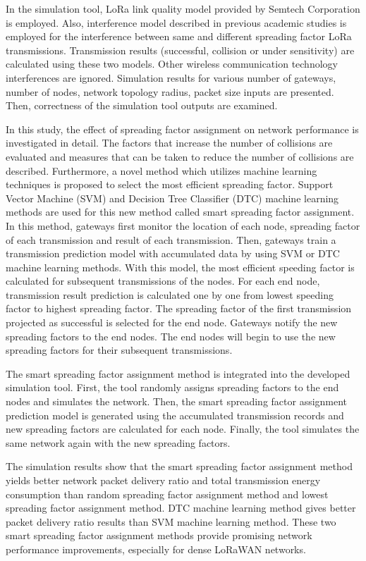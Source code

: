 In the simulation tool, LoRa link quality model provided by Semtech Corporation is employed. Also, interference model described in previous academic studies is employed for the interference between same and different spreading factor LoRa transmissions. Transmission results (successful, collision or under sensitivity) are calculated using these two models. Other wireless communication technology interferences are ignored. Simulation results for various number of gateways, number of nodes, network topology radius, packet size inputs are presented. Then, correctness of the simulation tool outputs are examined.

In this study, the effect of spreading factor assignment on network performance is investigated in detail. The factors that increase the number of collisions are evaluated and measures that can be taken to reduce the number of collisions are described. Furthermore, a novel method which utilizes machine learning techniques is proposed to select the most efficient spreading factor. Support Vector Machine (SVM) and Decision Tree Classifier (DTC) machine learning methods are used for this new method called smart spreading factor assignment. In this method, gateways first monitor the location of each node, spreading factor of each transmission and result of each transmission. Then, gateways train a transmission prediction model with accumulated data by using SVM or DTC machine learning methods. With this model, the most efficient speeding factor is calculated for subsequent transmissions of the nodes. For each end node, transmission result prediction is calculated one by one from lowest speeding factor to highest spreading factor. The spreading factor of the first transmission projected as successful is selected for the end node. Gateways notify the new spreading factors to the end nodes. The end nodes will begin to use the new spreading factors for their subsequent transmissions.

The smart spreading factor assignment method is integrated into the developed simulation tool. First, the tool randomly assigns spreading factors to the end nodes and simulates the network. Then, the smart spreading factor assignment prediction model is generated using the accumulated transmission records and new spreading factors are calculated for each node. Finally, the tool simulates the same network again with the new spreading factors.

The simulation results show that the smart spreading factor assignment method yields better network packet delivery ratio and total transmission energy consumption than random spreading factor assignment method and lowest spreading factor assignment method. DTC machine learning method gives better packet delivery ratio results than SVM machine learning method. These two smart spreading factor assignment methods provide promising network performance improvements, especially for dense LoRaWAN networks.
